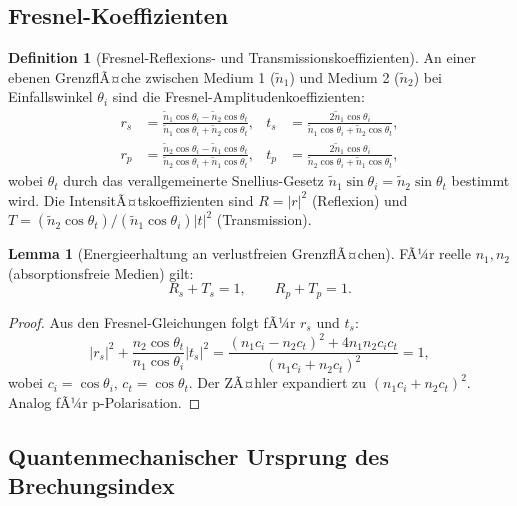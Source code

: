 ﻿\documentclass[a4paper,12pt]{article}
\theoremstyle{definition}
\newtheorem{definition}{Definition}[section]
\newtheorem{lemma}{Lemma}[section]
\begin{document}
	\subsection{Fresnel-Koeffizienten}
	\label{ssec:fresnel}
	
	\begin{definition}[Fresnel-Reflexions- und Transmissionskoeffizienten]
		\label{def:fresnel}
		An einer ebenen GrenzflÃ¤che zwischen Medium 1 ($\tilde{n}_1$) und
		Medium 2 ($\tilde{n}_2$) bei Einfallswinkel $\theta_i$ sind die
		Fresnel-Amplitudenkoeffizienten:
		\begin{align}
			r_s &= \frac{\tilde{n}_1 \cos\theta_i - \tilde{n}_2 \cos\theta_t}
			{\tilde{n}_1 \cos\theta_i + \tilde{n}_2 \cos\theta_t},
			& t_s &= \frac{2\tilde{n}_1 \cos\theta_i}
			{\tilde{n}_1 \cos\theta_i + \tilde{n}_2 \cos\theta_t},
			\label{eq:fresnel_s}\\
			r_p &= \frac{\tilde{n}_2 \cos\theta_i - \tilde{n}_1 \cos\theta_t}
			{\tilde{n}_2 \cos\theta_i + \tilde{n}_1 \cos\theta_t},
			& t_p &= \frac{2\tilde{n}_1 \cos\theta_i}
			{\tilde{n}_2 \cos\theta_i + \tilde{n}_1 \cos\theta_t},
			\label{eq:fresnel_p}
		\end{align}
		wobei $\theta_t$ durch das verallgemeinerte Snellius-Gesetz
		$\tilde{n}_1 \sin\theta_i = \tilde{n}_2 \sin\theta_t$ bestimmt wird.
		Die IntensitÃ¤tskoeffizienten sind $R = |r|^2$ (Reflexion) und
		$T = (\tilde{n}_2 \cos\theta_t)/(\tilde{n}_1 \cos\theta_i)|t|^2$ (Transmission).
	\end{definition}
	
	\begin{lemma}[Energieerhaltung an verlustfreien GrenzflÃ¤chen]
		\label{lem:energie}
		FÃ¼r reelle $n_1, n_2$ (absorptionsfreie Medien) gilt:
		\begin{equation}
			R_s + T_s = 1, \qquad R_p + T_p = 1.
		\end{equation}
	\end{lemma}
	
	\begin{proof}
		Aus den Fresnel-Gleichungen folgt fÃ¼r $r_s$ und $t_s$:
		\[
		|r_s|^2 + \frac{n_2 \cos\theta_t}{n_1 \cos\theta_i}|t_s|^2
		= \frac{(n_1 c_i - n_2 c_t)^2 + 4 n_1 n_2 c_i c_t}{(n_1 c_i + n_2 c_t)^2} = 1,
		\]
		wobei $c_i = \cos\theta_i$, $c_t = \cos\theta_t$.
		Der ZÃ¤hler expandiert zu $(n_1 c_i + n_2 c_t)^2$. Analog fÃ¼r p-Polarisation.
	\end{proof}
	
	\subsection{Quantenmechanischer Ursprung des Brechungsindex}
	\label{ssec:qm-brechung}
	
\end{document}
